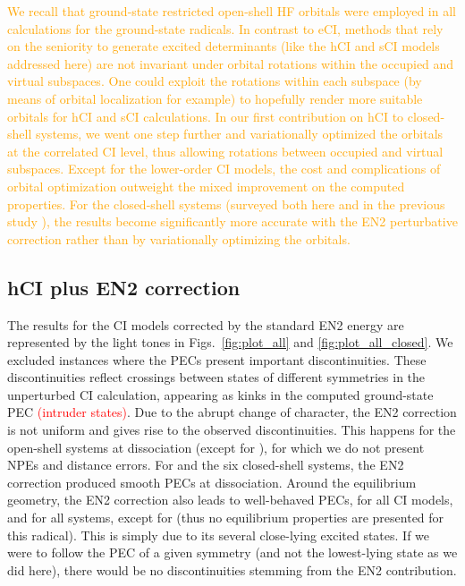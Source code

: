 \documentclass[aip,jcp,reprint,noshowkeys,superscriptaddress]{revtex4-1}
\newcommand{\fk}[1]{\textcolor{orange}{#1}}
\newcommand{\titou}[1]{\textcolor{red}{#1}}
\newcommand{\PFL}[1]{\titou{(\underline{\bf PFL}: #1)}}
\begin{document}
\fk{We recall that ground-state restricted open-shell HF orbitals were employed in all calculations for the ground-state radicals.
In contrast to eCI, methods that rely on the seniority to generate excited determinants (like the hCI and sCI models addressed here)
are not invariant under orbital rotations within the occupied and virtual subspaces. \cite{Bytautas_2011,Limacher_2014,Stein_2014}
One could exploit the rotations within each subspace (by means of orbital localization for example) to hopefully render more suitable orbitals for hCI and sCI calculations.
In our first contribution on hCI to closed-shell systems, \cite{Kossoski_2022} we went one step further
and variationally optimized the orbitals at the correlated CI level, thus allowing rotations between occupied and virtual subspaces.
Except for the lower-order CI models, the cost and complications of orbital optimization outweight the mixed improvement on the computed properties. \cite{Kossoski_2022}
For the closed-shell systems (surveyed both here and in the previous study \cite{Kossoski_2022}),
the results become significantly more accurate with the EN2 perturbative correction rather than by variationally optimizing the orbitals.}


\subsection{hCI plus EN2 correction}
\label{sec:res_B}

The results for the CI models corrected by the standard EN2 energy are represented by the light tones in Figs.~\ref{fig:plot_all} and \ref{fig:plot_all_closed}.
We excluded instances where the PECs present important discontinuities.
These discontinuities reflect crossings between states of different symmetries in the unperturbed CI calculation,
appearing as kinks in the computed ground-state PEC \titou{(intruder states)}.
Due to the abrupt change of character, the EN2 correction is not uniform and gives rise to the observed discontinuities.
This happens for the open-shell systems at dissociation (except for ), for which we do not present NPEs and distance errors.
For  and the six closed-shell systems, the EN2 correction produced smooth PECs at dissociation.
Around the equilibrium geometry, the EN2 correction also leads to well-behaved PECs, for all CI models, and for all systems, except for 
(thus no equilibrium properties are presented for this radical).
This is simply due to its several close-lying excited states.
If we were to follow the PEC of a given symmetry (and not the lowest-lying state as we did here), there would be no discontinuities stemming from the EN2 contribution.
\end{document}
